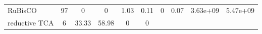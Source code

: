 \documentclass[]{article}
\begin{document}
\begin{longtable}[]{@{}lccccccccc@{}}
\begin{minipage}[t]{0.07\columnwidth}
RuBisCO\strut
\end{minipage} & \begin{minipage}[t]{0.06\columnwidth}\centering\strut
97\strut
\end{minipage} & \begin{minipage}[t]{0.08\columnwidth}\centering\strut
0\strut
\end{minipage} & \begin{minipage}[t]{0.08\columnwidth}\centering\strut
0\strut
\end{minipage} & \begin{minipage}[t]{0.08\columnwidth}\centering\strut
1.03\strut
\end{minipage} & \begin{minipage}[t]{0.08\columnwidth}\centering\strut
0.11\strut
\end{minipage} & \begin{minipage}[t]{0.08\columnwidth}\centering\strut
0\strut
\end{minipage} & \begin{minipage}[t]{0.08\columnwidth}\centering\strut
0.07\strut
\end{minipage} & \begin{minipage}[t]{0.08\columnwidth}\centering\strut
3.63e+09\strut
\end{minipage} & \begin{minipage}[t]{0.08\columnwidth}\centering\strut
5.47e+09\strut
\end{minipage}\tabularnewline
\begin{minipage}[t]{0.07\columnwidth}\raggedright\strut
reductive TCA\strut
\end{minipage} & \begin{minipage}[t]{0.06\columnwidth}\centering\strut
6\strut
\end{minipage} & \begin{minipage}[t]{0.08\columnwidth}\centering\strut
33.33\strut
\end{minipage} & \begin{minipage}[t]{0.08\columnwidth}\centering\strut
58.98\strut
\end{minipage} & \begin{minipage}[t]{0.08\columnwidth}\centering\strut
0\strut
\end{minipage} & \begin{minipage}[t]{0.08\columnwidth}\centering\strut
0\strut
\end{minipage} & \begin{minipage}[t]{0.08\columnwidth}\centering\strut

\end{minipage}
\end{longtable}
\end{document}
